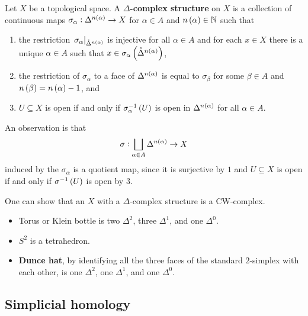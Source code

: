 \begin{definition*}
Let $ X $ be a topological space. A \textbf{$ \Delta $-complex structure} on $ X $ is a collection of continuous maps $ \sigma_\alpha : \Delta^{n\br{\alpha}} \to X $ for $ \alpha \in A $ and $ n\br{\alpha} \in \N $ such that
\begin{enumerate}
\item the restriction $ \eval{\sigma_\alpha}_{\mathring{\Delta}^{n\br{\alpha}}} $ is injective for all $ \alpha \in A $ and for each $ x \in X $ there is a unique $ \alpha \in A $ such that $ x \in \sigma_\alpha\br{\mathring{\Delta}^{n\br{\alpha}}} $,
\item the restriction of $ \sigma_\alpha $ to a face of $ \Delta^{n\br{\alpha}} $ is equal to $ \sigma_\beta $ for some $ \beta \in A $ and $ n\br{\beta} = n\br{\alpha} - 1 $, and
\item $ U \subseteq X $ is open if and only if $ \sigma_\alpha^{-1}\br{U} $ is open in $ \Delta^{n\br{\alpha}} $ for all $ \alpha \in A $.
\end{enumerate}
\end{definition*}

An observation is that
$$ \sigma : \bigsqcup_{\alpha \in A} \Delta^{n\br{\alpha}} \to X $$
induced by the $ \sigma_\alpha $ is a quotient map, since it is surjective by $ 1 $ and $ U \subseteq X $ is open if and only if $ \sigma^{-1}\br{U} $ is open by $ 3 $.

\begin{remark*}
One can show that an $ X $ with a $ \Delta $-complex structure is a CW-complex.
\end{remark*}

\begin{example*}
\hfill
\begin{itemize}
\item Torus or Klein bottle is two $ \Delta^2 $, three $ \Delta^1 $, and one $ \Delta^0 $.
\item $ S^2 $ is a tetrahedron.
\item \textbf{Dunce hat}, by identifying all the three faces of the standard $ 2 $-simplex with each other, is one $ \Delta^2 $, one $ \Delta^1 $, and one $ \Delta^0 $.
\end{itemize}
\end{example*}

\pagebreak

\subsection{Simplicial homology}

